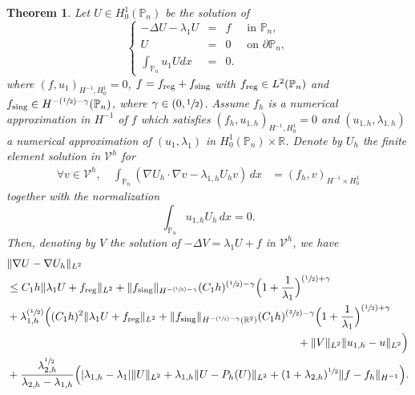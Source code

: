 \documentclass[JEP,XML,SOM,Unicode,ThmDefs,NoFloatCountersInSection,published]{cedram}
\newcommand{\Psfrac}[2]{(\sfrac{#1}{#2})}
\theoremstyle{plain}
\newtheorem{thm}{Theorem}[section]
\theoremstyle{definition}
\newcommand{\reg}{\textup{reg}}
\newcommand{\sing}{\textup{sing}}
\def\R{\mathbb{R}}
\def\Pp{{\mathbb{P}_n}}
\newcommand{\lb}{\lambda}
\begin{document}
\begin{thm}\label{thm:estimate-singular}
Let $U\in H^1_0(\Pp)$ be the solution of
\begin{equation}\label{bobu28.1}
\left\{ \begin{array}{rcll}
-\Delta U - \lb_1U& =&f& \text{ in } \Pp,\\
U&= &0 & \text{ on }\partial \Pp,\\
\int_{\Pp} u_1U dx&= &0.
\end{array} \right.
\end{equation}
where $(f,u_1)_{H^{-1},H_0^1} = 0$, $f= f_{\reg}+{f_{\sing}} $ with $f_{\reg} \in L^2(\Pp)$ and $f_{\sing} \in H^{-\Psfrac 12 -\gamma} (\Pp)$, where $\gamma \in (0,\sfrac{1}{2})$. Assume $f_h$ is a numerical approximation in $H^{-1}$ of $f$ which satisfies $(f_h,u_{1,h})_{H^{-1},H_0^1}=0$ and $(u_{1,h}, \lb_{1,h})$ a numerical approximation of $(u_1, \lb_1)$ in $H^1_0(\Pp)\times \R$. Denote by $U_h $ the finite element solution in $\mathcal V^h$ for
\begin{align}\forall v \in \mathcal V^h, \quad \int_{\Pp} (\nabla U_h \cdot \nabla v-\lambda_{1,h} U_hv) \, dx& =(f_h, v)_{H^{-1}\times H^1_0} \label{eq:material-eig-decomposed.h}
\end{align}
together with the normalization
\begin{equation}
\int_{\Pp} u_{1,h}U_h \, dx = 0.
\label{eq:normalization.h}
\end{equation}
Then, denoting by $V$ the solution of $-\Delta V = \lambda_1 U+f$ in $\mathcal V^h$, we have
\begin{align*}
&\|\nabla U-\nabla U_h\|_{L^2}\\
&\le C_1 h \| \lb_1 U+ f_{\reg}\|_{L^2}+ \|f_{\sing}\|_{H^{-\Psfrac 12 -\gamma}} (C_1 h)^{\Psfrac 12 -\gamma}\Bigl(1+\frac {1}{\lambda_1}\Bigr)^{\Psfrac 12 +\gamma}\\
&+ \lambda_{1,h}^{\Psfrac{1}{2}}\Big((C_1 h)^2 \| \lb_1 U+ f_{\reg}\|_{L^2}
+ \|f_{\sing}\|_{H^{-\Psfrac 12 -\gamma} (\R^2)} (C_1 h)^{\Psfrac 32 -\gamma}\Bigl(1+\frac {1}{\lambda_1}\Bigr)^{\Psfrac 12 +\gamma} \\
& \hspace*{9.3cm}+\|V\|_{L^2}\|u_{1,h}-u\|_{L^2}\Big)\\
&+\frac{\lb_{2,h}^{\sfrac 12}}{\lb_{2,h}-\lb_{1,h}} \Big (|\lb_{1,h}-\lb_1| \|U\|_{L^2} + \lb_{1,h}\|U-P_h(U)\|_{L^2}+ (1+ \lb_{2,h})^{\sfrac 12}\|f-f_h\|_{H^{-1}}\Big).
\end{align*}

\end{thm}
\end{document}
